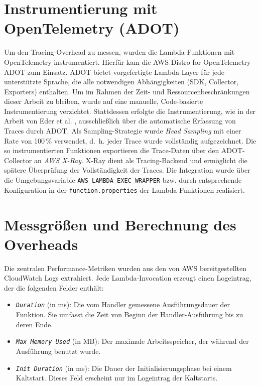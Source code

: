 \section{Instrumentierung mit OpenTelemetry (ADOT)}
\label{sec:instrumentierung}

Um den Tracing-Overhead zu messen, wurden die Lambda-Funktionen mit OpenTelemetry instrumentiert. Hierfür kam die AWS Distro for 
OpenTelemetry \ac{ADOT} zum Einsatz. ADOT bietet vorgefertigte Lambda-Layer für jede unterstützte Sprache, die alle notwendigen 
Abhängigkeiten (SDK, Collector, Exporters) enthalten. Um im Rahmen der Zeit- und Ressourcenbeschränkungen dieser Arbeit zu bleiben, 
wurde auf eine manuelle, Code-basierte Instrumentierung verzichtet. Stattdessen erfolgte die Instrumentierung, wie in der Arbeit von
Eder et al. \cite{10254754}, ausschließlich über die automatische Erfassung von Traces durch \ac{ADOT}.
Als Sampling-Strategie wurde \emph{Head Sampling} mit einer Rate von 100\,\% verwendet, d.~h. jeder Trace wurde vollständig aufgezeichnet. 
Die so instrumentierten Funktionen exportieren die Trace-Daten über den ADOT-Collector an \emph{AWS X-Ray}. 
X-Ray dient als Tracing-Backend und ermöglicht die spätere Überprüfung der Vollständigkeit der Traces. 
Die Integration wurde über die Umgebungsvariable \texttt{AWS\_LAMBDA\_EXEC\_WRAPPER} bzw. durch entsprechende Konfiguration in 
der \texttt{function.properties} der Lambda-Funktionen realisiert.

\section{Messgrößen und Berechnung des Overheads}
\label{sec:messgroessen}

Die zentralen Performance-Metriken wurden aus den von AWS bereitgestellten CloudWatch Logs extrahiert. Jede Lambda-Invocation 
erzeugt einen Logeintrag, der die folgenden Felder enthält:

\begin{itemize}
    \item \emph{\texttt{Duration}} (in ms): Die vom Handler gemessene Ausführungsdauer der Funktion. 
	Sie umfasst die Zeit von Beginn der Handler-Ausführung bis zu deren Ende.
    \item \emph{\texttt{Max Memory Used}} (in MB): Der maximale Arbeitsspeicher, der während der Ausführung benutzt wurde.
    \item \emph{\texttt{Init Duration}} (in ms): Die Dauer der Initialisierungsphase bei einem Kaltstart. Dieses Feld erscheint 
	nur im Logeintrag der Kaltstarts.
\end{itemize}

